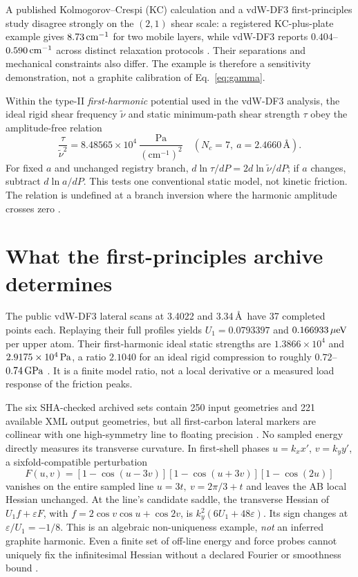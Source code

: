 \documentclass[9pt,a4paper,twocolumn]{extarticle}
\begin{document}
A published Kolmogorov--Crespi (KC) calculation and a vdW-DF3 first-principles study disagree strongly on the $(2,1)$ shear scale: a registered KC-plus-plate example gives $8.73\,{\rm cm}^{-1}$ for two mobile layers, while vdW-DF3 reports $0.404$--$0.590\,{\rm cm}^{-1}$ across distinct relaxation protocols \cite{minkin,lebedeva,udrecord}. Their separations and mechanical constraints also differ. The example is therefore a sensitivity demonstration, not a graphite calibration of Eq.~\eqref{eq:gamma}.

Within the type-II \emph{first-harmonic} potential used in the vdW-DF3 analysis, the ideal rigid shear frequency $\widetilde\nu$ and static minimum-path shear strength $\tau$ obey the amplitude-free relation
\begin{equation}
 \frac{\tau}{\widetilde\nu^2}=
 8.48565\times10^4\ \frac{\mathrm{Pa}}{(\mathrm{cm}^{-1})^2}
 \quad (N_c=7,\ a=2.4660\,\text{\AA}).\label{eq:static}
\end{equation}
For fixed $a$ and unchanged registry branch, $d\ln\tau/dP=2d\ln\widetilde\nu/dP$; if $a$ changes, subtract $d\ln a/dP$. This tests one conventional static model, not kinetic friction. The relation is undefined at a branch inversion where the harmonic amplitude crosses zero \cite{lebedeva,udrecord}.

\section{What the first-principles archive determines}
The public vdW-DF3 lateral scans at 3.4022 and 3.34\,\AA\ have 37 completed points each. Replaying their full profiles yields $U_1=0.0793397$ and $0.166933\,\mu{\rm eV}$ per upper atom. Their first-harmonic ideal static strengths are $1.3866\times10^4$ and $2.9175\times10^4\,{\rm Pa}$, a ratio $2.1040$ for an ideal rigid compression to roughly $0.72$--$0.74\,{\rm GPa}$ \cite{lebedeva,zenodo,udrecord}. It is a finite model ratio, not a local derivative or a measured load response of the friction peaks.

The six SHA-checked archived sets contain 250 input geometries and 221 available XML output geometries, but all first-carbon lateral markers are collinear with one high-symmetry line to floating precision \cite{udrecord,zenodo}. No sampled energy directly measures its transverse curvature. In first-shell phases $u=k_xx'$, $v=k_yy'$, a sixfold-compatible perturbation
\begin{equation}
 F(u,v)=[1-\cos(u-3v)][1-\cos(u+3v)][1-\cos(2u)] \label{eq:null}
\end{equation}
vanishes on the entire sampled line $u=3t,\ v=2\pi/3+t$ and leaves the AB local Hessian unchanged. At the line's candidate saddle, the transverse Hessian of $U_1f+\varepsilon F$, with $f=2\cos v\cos u+\cos2v$, is $k_y^2(6U_1+48\varepsilon)$. Its sign changes at $\varepsilon/U_1=-1/8$. This is an algebraic non-uniqueness example, \emph{not} an inferred graphite harmonic. Even a finite set of off-line energy and force probes cannot uniquely fix the infinitesimal Hessian without a declared Fourier or smoothness bound \cite{udrecord}.
\end{document}
